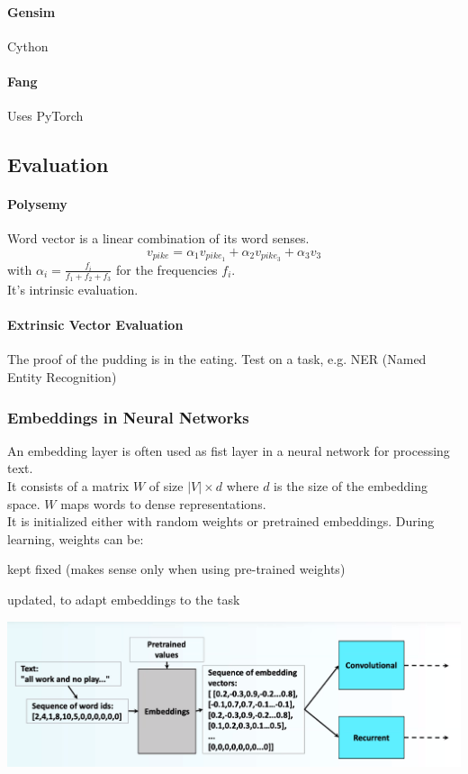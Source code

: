 \documentclass[10pt]{report}
\begin{document}
\paragraph{Gensim} Cython
\paragraph{Fang} Uses PyTorch
\subsection{Evaluation}
\paragraph{Polysemy} Word vector is a linear combination of its word senses.
$$v_{pike} = \alpha_1v_{pike_1} + \alpha_2v_{pike_3} + \alpha_3v_3$$
with $\alpha_i = \frac{f_i}{f_1+f_2+f_3}$ for the frequencies $f_i$.\\
It's intrinsic evaluation.
\paragraph{Extrinsic Vector Evaluation} The proof of the pudding is in the eating. Test on a task, e.g. NER (Named Entity Recognition)
\subsubsection{Embeddings in Neural Networks} An embedding layer is often used as fist layer in a neural network for processing text.\\
It consists of a matrix $W$ of size $|V|\times d$ where $d$ is the size of the embedding space. $W$ maps words to dense representations.\\
It is initialized either with random weights or pretrained embeddings. During learning, weights can be:
\begin{list}{}{}
	\item kept fixed (makes sense only when using pre-trained weights)
	\item updated, to adapt embeddings to the task
\end{list}
\begin{center}
	\includegraphics[scale=0.5]{7.png}
\end{center}
\end{document}
